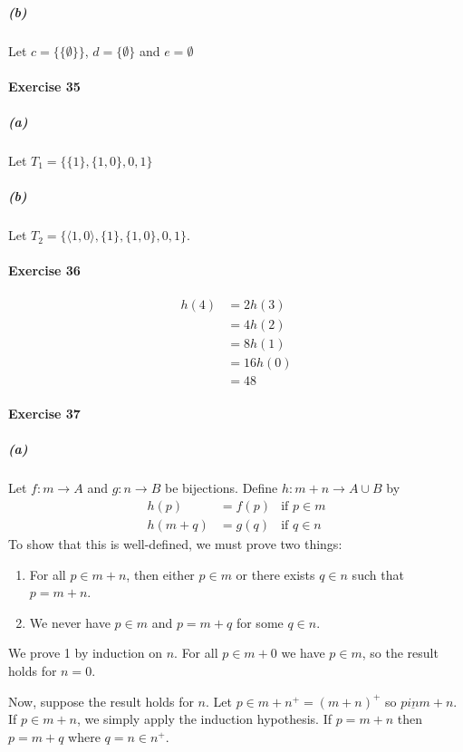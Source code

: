 \documentclass{report}
\begin{document}
    \subparagraph{(b)}
    Let $c = \{ \{ \emptyset \} \}$, $d = \{ \emptyset \}$ and $e = \emptyset$

    \paragraph{Exercise 35}
    \subparagraph{(a)}
    Let $T_1 = \{ \{1\}, \{1,0\}, 0, 1 \}$

    \subparagraph{(b)}
    Let $T_2 = \{ \langle 1, 0 \rangle, \{1\}, \{1,0\}, 0, 1 \}$.

    \paragraph{Exercise 36}
    \begin{align*}
        h(4) & = 2h(3) \\
        & = 4h(2) \\
        & = 8h(1) \\
        & = 16h(0) \\
        & = 48
    \end{align*}

    \paragraph{Exercise 37}
    \subparagraph{(a)}
    Let $f : m \rightarrow A$ and $g : n \rightarrow B$ be bijections. Define $h : m + n \rightarrow A \cup B$
    by
    \begin{align*}
        h(p) & = f(p) & \text{if } p \in m \\
        h(m + q) & = g(q) & \text{if } q \in n
    \end{align*}
    To show that this is well-defined, we must prove two things:
    \begin{enumerate}
        \item For all $p \in m + n$, then either $p \in m$ or there
    exists $q \in n$ such that $p = m + n$.
        \item We never have $p \in m$ and $p = m + q$ for some $q \in n$.
    \end{enumerate}

    We prove 1 by induction on $n$. For all $p \in m + 0$ we have $p \in m$, so the result holds for $n = 0$.

    Now, suppose the result holds for $n$. Let $p \in m + n^+ = (m+n)^+$ so $p \underline{in} m + n$.
    If $p \in m + n$, we simply apply the induction hypothesis. If $p = m + n$ then $p = m + q$ where
    $q = n \in n^+$.
\end{document}
